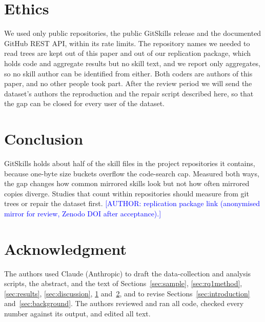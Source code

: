\documentclass[10pt,conference]{IEEEtran}
\newcommand{\todo}[1]{\textcolor{blue}{[#1]}}
\begin{document}
\section{Ethics}
\label{sec:ethics}
We used only public repositories, the public GitSkills release and the documented GitHub REST API, within its rate
limits. The repository names we needed to read trees are kept out of this paper and out of our replication package,
which holds code and aggregate results but no skill text, and we report only aggregates, so no skill author can be
identified from either. Both coders are authors of this paper, and no other people took part. After the review period
we will send the dataset's authors the reproduction and the repair script described here, so that the gap can be
closed for every user of the dataset.

\section{Conclusion}
\label{sec:conclusion}
GitSkills holds about half of the skill files in the project repositories it contains, because one-byte size buckets
overflow the code-search cap. Measured both ways, the gap changes how common mirrored skills look but not how often
mirrored copies diverge. Studies that count within repositories should measure from git trees or repair the dataset
first. \todo{AUTHOR: replication package link (anonymised mirror for review, Zenodo DOI after acceptance).}

\section*{Acknowledgment}
The authors used Claude (Anthropic) to draft the data-collection and analysis scripts, the abstract, and the text of
Sections~\ref{sec:sample}, \ref{sec:rq1method}, \ref{sec:results}, \ref{sec:discussion}, \ref{sec:ethics}
and~\ref{sec:conclusion}, and to revise Sections~\ref{sec:introduction} and~\ref{sec:background}. The authors reviewed and ran all code, checked every number against its output, and
edited all text.



\end{document}
